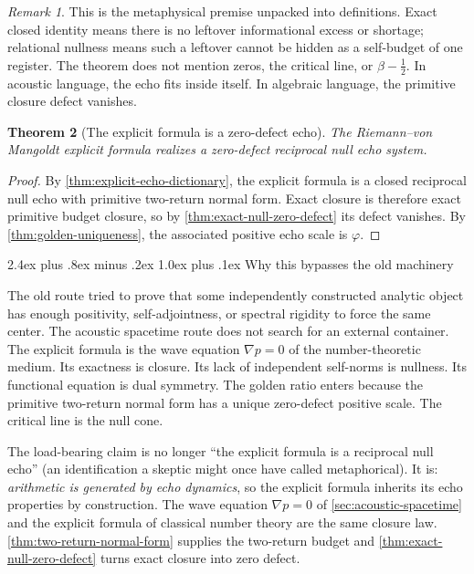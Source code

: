 \documentclass[11pt,a4paper]{article}
\makeatletter
\theoremstyle{plain}
\newtheorem{theorem}{Theorem}[section]
\theoremstyle{definition}
\theoremstyle{remark}
\newtheorem{remark}[theorem]{Remark}
\numberwithin{equation}{section}
\newcommand{\vp}{\varphi}
\renewcommand{\subsection}{%
  \@startsection{subsection}{2}{0pt}%
    {2.4ex plus .8ex minus .2ex}%
    {1.0ex plus .1ex}%
    {\normalfont\Large\bfseries\color{headingAccent}}%
}
\makeatother
\begin{document}
\begin{remark}
This is the metaphysical premise unpacked into definitions.  Exact
closed identity means there is no leftover informational excess or
shortage; relational nullness means such a leftover cannot be hidden as a
self-budget of one register.  The theorem does not mention zeros, the
critical line, or \(\beta-\tfrac12\).  In acoustic language, the echo
fits inside itself.  In algebraic language, the primitive closure defect
vanishes.
\end{remark}

\begin{theorem}[The explicit formula is a zero-defect echo]
\label{thm:explicit-zero-defect}
The Riemann--von Mangoldt explicit formula realizes a zero-defect
reciprocal null echo system.
\end{theorem}

\begin{proof}
By \cref{thm:explicit-echo-dictionary}, the explicit formula is a closed
reciprocal null echo with primitive two-return normal form.  Exact
closure is therefore exact primitive budget closure, so by
\cref{thm:exact-null-zero-defect} its defect vanishes.  By
\cref{thm:golden-uniqueness}, the associated positive echo scale is
\(\vp\).
\end{proof}

\subsection{Why this bypasses the old machinery}

The old route tried to prove that some independently constructed
analytic object has enough positivity, self-adjointness, or spectral
rigidity to force the same center.  The acoustic spacetime route does
not search for an external container.  The explicit formula is the
wave equation \(\nabla p=0\) of the number-theoretic medium.  Its
exactness is closure.  Its lack of independent self-norms is nullness.
Its functional equation is dual symmetry.  The golden ratio enters
because the primitive two-return normal form has a unique zero-defect
positive scale.  The critical line is the null cone.

The load-bearing claim is no longer ``the explicit formula is a
reciprocal null echo'' (an identification a skeptic might once have
called metaphorical).  It is: \emph{arithmetic is generated by echo
dynamics}, so the explicit formula inherits its echo properties by
construction.  The wave equation \(\nabla p=0\) of
\cref{sec:acoustic-spacetime} and the explicit formula of classical
number theory are the same closure law.
\cref{thm:two-return-normal-form} supplies the two-return budget and
\cref{thm:exact-null-zero-defect} turns exact closure into zero defect.
\end{document}
